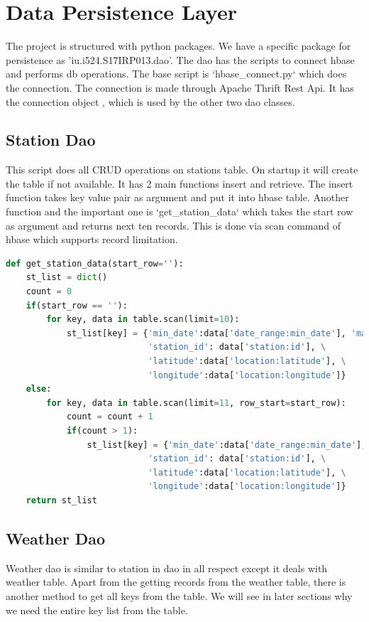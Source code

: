 \documentclass[9pt,twocolumn,twoside]{../../styles/osajnl}
\begin{document}
\section{Data Persistence Layer}
The project is structured with python packages. We have a specific package for persistence as 'iu.i524.S17IRP013.dao'. The dao has the scripts to connect hbase and performs db operations. The base script is `hbase\_connect.py` which does the connection. The connection is made through Apache Thrift Rest Api. It has the connection object , which is used by the other two dao classes.

\subsection{Station Dao}
This script does all CRUD operations on stations table. On startup it will create the table if not available. It has 2 main functions insert and retrieve. The insert function takes key value pair as argument and put it into hbase table. Another function and the important one is `get\_station\_data` which takes the start row as argument and returns next ten records. This is done via scan command of hbase which supports record limitation.
\begin{lstlisting}[language=Python,caption=Stations Dao,breaklines=true]
def get_station_data(start_row=''):   
    st_list = dict()
    count = 0    
    if(start_row == ''):    
        for key, data in table.scan(limit=10):
            st_list[key] = {'min_date':data['date_range:min_date'], 'max_date':data['date_range:max_date'] , \
                            'station_id': data['station:id'], \
                            'latitude':data['location:latitude'], \
                            'longitude':data['location:longitude']}            
    else:
        for key, data in table.scan(limit=11, row_start=start_row):            
            count = count + 1
            if(count > 1):
                st_list[key] = {'min_date':data['date_range:min_date'], 'max_date':data['date_range:max_date'], \
                            'station_id': data['station:id'], \
                            'latitude':data['location:latitude'], \
                            'longitude':data['location:longitude']}    
    return st_list
\end{lstlisting}
\subsection{Weather Dao}
Weather dao is similar to station in dao in all respect except it deals with weather table. Apart from the getting records from the weather table, there is another method to get all keys from the table. We will see in later sections why we need the entire key list from the table.
\end{document}
